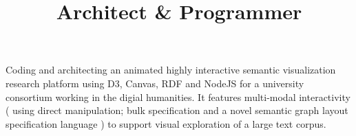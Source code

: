 \title{ Architect \& Programmer }
\begin{position}
Coding and architecting an animated highly interactive semantic
visualization research platform using D3, Canvas, RDF and NodeJS for a
university consortium working in the digial humanities.  It features
multi-modal interactivity ( using direct manipulation; bulk
specification and a novel semantic graph layout specification language
) to support visual exploration of a large text corpus.
\end{position}

